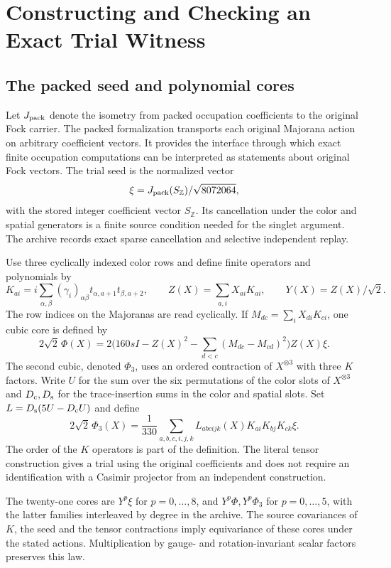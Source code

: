 \chapter{Constructing and Checking an Exact Trial Witness}\label{ch:witness}

\section{The packed seed and polynomial cores}
Let $J_{\rm pack}$ denote the isometry from packed occupation coefficients to the original Fock carrier. The packed formalization transports each original Majorana action on arbitrary coefficient vectors. It provides the interface through which exact finite occupation computations can be interpreted as statements about original Fock vectors. The trial seed is the normalized vector
\[
 \xi=J_{\rm pack}(S_{\mathbb Z})/\sqrt{8072064},
\]
with the stored integer coefficient vector $S_{\mathbb Z}$. Its cancellation under the color and spatial generators is a finite source condition needed for the singlet argument. The archive records exact sparse cancellation and selective independent replay.

Use three cyclically indexed color rows and define finite operators and polynomials by
\[
 K_{ai}=i\sum_{\alpha,\beta}(\gamma_i)_{\alpha\beta}
            t_{\alpha,a+1}t_{\beta,a+2},\qquad
 Z(X)=\sum_{a,i}X_{ai}K_{ai},\qquad Y(X)=Z(X)/\sqrt2.
\]
The row indices on the Majoranas are read cyclically. If $M_{dc}=\sum_iX_{di}K_{ci}$, one cubic core is defined by
\[
 2\sqrt2\,\Phi(X)=2\bigg(160sI-Z(X)^2
                  -\sum_{d<c}(M_{dc}-M_{cd})^2\bigg)Z(X)\xi .
\]
The second cubic, denoted $\Phi_3$, uses an ordered contraction of $X^{\otimes3}$ with three $K$ factors. Write $U$ for the sum over the six permutations of the color slots of $X^{\otimes3}$ and $D_{\rm c},D_{\rm s}$ for the trace-insertion sums in the color and spatial slots. Set $L=D_{\rm s}(5U-D_{\rm c}U)$ and define
\[
 2\sqrt2\,\Phi_3(X)
  =\frac1{330}\sum_{a,b,c,i,j,k}
     L_{abcijk}(X)K_{ai}K_{bj}K_{ck}\xi .
\]
The order of the $K$ operators is part of the definition. The literal tensor construction gives a trial using the original coefficients and does not require an identification with a Casimir projector from an independent construction.

The twenty-one cores are $Y^p\xi$ for $p=0,\ldots,8$, and $Y^p\Phi,Y^p\Phi_3$ for $p=0,\ldots,5$, with the latter families interleaved by degree in the archive. The source covariances of $K$, the seed and the tensor contractions imply equivariance of these cores under the stated actions. Multiplication by gauge- and rotation-invariant scalar factors preserves this law.

